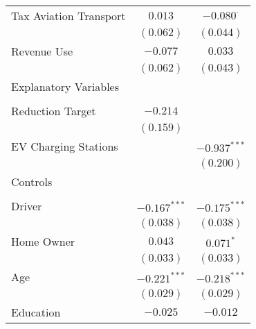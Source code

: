 \begin{center}
\begin{tiny}
\begin{longtable}{l@{} c@{} c@{}}
\quad Tax Aviation Transport                              & $0.013$          & $-0.080^{\cdot}$ \\
                                                          & $(0.062)$        & $(0.044)$        \\
\quad Revenue Use                                         & $-0.077$         & $0.033$          \\
                                                          & $(0.062)$        & $(0.043)$        \\
Explanatory Variables                                     &                  &                  \\
                                                          &                  &                  \\
\quad Reduction Target                                    & $-0.214$         &                  \\
                                                          & $(0.159)$        &                  \\
\quad EV Charging Stations                                &                  & $-0.937^{***}$   \\
                                                          &                  & $(0.200)$        \\
Controls                                                  &                  &                  \\
                                                          &                  &                  \\
\quad Driver                                              & $-0.167^{***}$   & $-0.175^{***}$   \\
                                                          & $(0.038)$        & $(0.038)$        \\
\quad Home Owner                                          & $0.043$          & $0.071^{*}$      \\
                                                          & $(0.033)$        & $(0.033)$        \\
\quad Age                                                 & $-0.221^{***}$   & $-0.218^{***}$   \\
                                                          & $(0.029)$        & $(0.029)$        \\
\quad Education                                           & $-0.025$         & $-0.012$         \\

\end{longtable}
\end{tiny}
\end{center}
